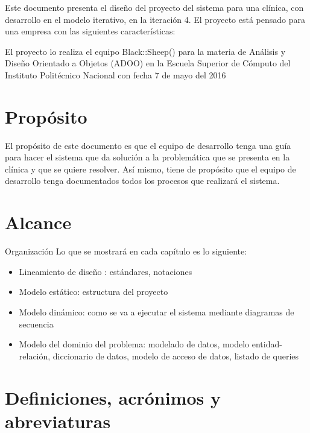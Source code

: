 Este documento presenta el diseño del proyecto del sistema para una clínica, con desarrollo en el modelo iterativo, en la iteración 4. El proyecto está pensado para una empresa con las siguientes características:

El proyecto lo realiza el equipo Black::Sheep() para la materia de Análisis y Diseño Orientado a Objetos (ADOO) en la Escuela Superior de Cómputo del Instituto Politécnico Nacional con fecha 7 de mayo del 2016


\section{Propósito}
El propósito de este documento es que el equipo de desarrollo tenga una guía para hacer el sistema que da solución a la problemática que se presenta en la clínica y que se quiere resolver. Así mismo,  tiene de propósito que  el equipo de desarrollo tenga documentados todos los procesos que realizará el sistema.
\section{Alcance}

Organización
Lo que se mostrará en cada capítulo es lo siguiente:
\begin{itemize}
\item Lineamiento de diseño : estándares, notaciones

\item Modelo estático: estructura del proyecto

\item Modelo dinámico: como se va a ejecutar el sistema mediante diagramas de secuencia

\item Modelo del dominio del problema: modelado de datos, modelo entidad-relación, diccionario de datos, modelo de acceso de datos, listado de queries

\end{itemize}

\section{Definiciones, acrónimos y abreviaturas}

